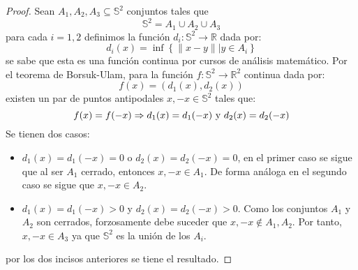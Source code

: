 \documentclass{article}
\newcounter{it}
\theoremstyle{largebreak}
\newcommand\cf[3]{\ensuremath{#1:#2\rightarrow#3}}
\begin{document}
    \begin{proof}
        Sean $A_1,A_2,A_3\subseteq\mathbb{S}^2$ conjuntos tales que
        \begin{equation*}
            \mathbb{S}^2=A_1\cup A_2\cup A_3
        \end{equation*}
        para cada $i=1,2$ definimos la función $\cf{d_i}{\mathbb{S}^2}{\mathbb{R}}$ dada por:
        \begin{equation*}
            d_i(x)=\inf\left\{\|x-y\|\Big|y\in A_i \right\}
        \end{equation*}
        se sabe que esta es una función continua por cursos de análisis matemático. Por el teorema de Borsuk-Ulam, para la función $\cf{f}{\mathbb{S}^2}{\mathbb{R}^2}$ continua dada por:
        \begin{equation*}
            f(x)=(d_1(x),d_2(x))
        \end{equation*}
        existen un par de puntos antipodales $x,-x\in\mathbb{S}^2$ tales que:
        \begin{equation*}
            f(x)=f(-x)\Rightarrow d_1(x)=d_1(-x)\textup{ y }d_2(x)=d_2(-x)
        \end{equation*}
        Se tienen dos casos:
        \begin{itemize}
            \item $d_1(x)=d_1(-x)=0$ o $d_2(x)=d_2(-x)=0$, en el primer caso se sigue que al ser $A_1$ cerrado, entonces $x,-x\in A_1$. De forma análoga en el segundo caso se sigue que $x,-x\in A_2$.
            \item $d_1(x)=d_1(-x)>0$ y $d_2(x)=d_2(-x)>0$. Como los conjuntos $A_1$ y $A_2$ son cerrados, forzosamente debe suceder que $x,-x\notin A_1,A_2$. Por tanto, $x,-x\in A_3$ ya que $\mathbb{S}^2$ es la unión de los $A_i$.
        \end{itemize}
        por los dos incisos anteriores se tiene el resultado.
    \end{proof}
\end{document}
